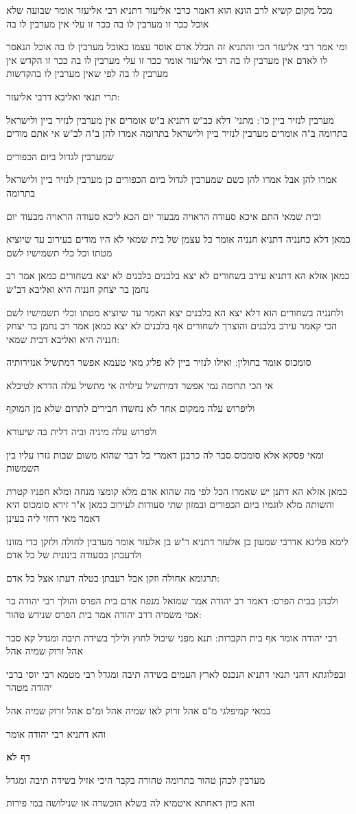 \documentclass[12pt, openany]{book}
\newcommand{\sethebfont}{
\fontsize{10.5pt}{21.0pt} \selectfont
}
\newcommand{\textblock}[1]{
{\sethebfont #1\\}	
}
\newcommand{\sectname}{}
\newcommand{\newsection}[1]{
	\addcontentsline{toc}{section}{#1}
	\renewcommand{\sectname}{#1}	
	\vspace{-\baselineskip}
	\begin{center}
		\textbf{%
\fontsize{16pt}{16pt}\selectfont
			#1}
	\end{center}
	\vspace{-\baselineskip}
	\nopagebreak
}
\begin{document}
\textblock{מכל מקום קשיא לרב הונא הוא דאמר כרבי אליעזר דתניא רבי אליעזר אומר שבועה שלא אוכל ככר זו מערבין לו בה ככר זו עלי אין מערבין לו בה}
\textblock{ומי אמר רבי אליעזר הכי והתניא זה הכלל אדם אוסר עצמו באוכל מערבין לו בה אוכל הנאסר לו לאדם אין מערבין לו בה רבי אליעזר אומר ככר זו עלי מערבין לו בה ככר זו הקדש אין מערבין לו בה לפי שאין מערבין לו בהקדשות}
\textblock{תרי תנאי ואליבא דרבי אליעזר:}
\textblock{מערבין לנזיר ביין כו': מתני' דלא כב"ש דתניא ב"ש אומרים אין מערבין לנזיר ביין ולישראל בתרומה ב"ה אומרים מערבין לנזיר ביין ולישראל בתרומה אמרו להן ב"ה לב"ש אי אתם מודים}
\textblock{שמערבין לגדול ביום הכפורים}
\textblock{אמרו להן אבל אמרו להן כשם שמערבין לגדול ביום הכפורים כן מערבין לנזיר ביין ולישראל בתרומה}
\textblock{ובית שמאי התם איכא סעודה הראויה מבעוד יום הכא ליכא סעודה הראויה מבעוד יום}
\textblock{כמאן דלא כחנניה דתניא חנניה אומר כל עצמן של בית שמאי לא היו מודים בעירוב עד שיוציא מטתו וכל כלי תשמישיו לשם}
\textblock{כמאן אזלא הא דתניא עירב בשחורים לא יצא בלבנים בלבנים לא יצא בשחורים כמאן אמר רב נחמן בר יצחק חנניה היא ואליבא דב"ש}
\textblock{ולחנניה בשחורים הוא דלא יצא הא בלבנים יצא האמר עד שיוציא מטתו וכלי תשמישיו לשם הכי קאמר עירב בלבנים והוצרך לשחורים אף בלבנים לא יצא כמאן אמר רב נחמן בר יצחק חנניה היא ואליבא דבית שמאי:}
\textblock{סומכוס אומר בחולין: ואילו לנזיר ביין לא פליג מאי טעמא אפשר דמתשיל אנזירותיה}
\textblock{אי הכי תרומה נמי אפשר דמיתשיל עילויה אי מתשיל עלה הדרא לטיבלא}
\textblock{וליפרוש עלה ממקום אחר לא נחשדו חבירים לתרום שלא מן המוקף}
\textblock{ולפרוש עלה מיניה וביה דלית בה שיעורא}
\textblock{ומאי פסקא אלא סומכוס סבר לה כרבנן דאמרי כל דבר שהוא משום שבות גזרו עליו בין השמשות}
\textblock{כמאן אזלא הא דתנן יש שאמרו הכל לפי מה שהוא אדם מלא קומצו מנחה ומלא חפניו קטרת והשותה מלא לוגמיו ביום הכפורים ובמזון שתי סעודות לעירוב כמאן א"ר זירא סומכוס היא דאמר מאי דחזי ליה בעינן}
\textblock{לימא פליגא אדרבי שמעון בן אלעזר דתניא ר"ש בן אלעזר אומר מערבין לחולה ולזקן כדי מזונו ולרעבתן בסעודה בינונית של כל אדם}
\textblock{תרגומא אחולה וזקן אבל רעבתן בטלה דעתו אצל כל אדם:}
\textblock{ולכהן בבית הפרס: דאמר רב יהודה אמר שמואל מנפח אדם בית הפרס והולך רבי יהודה בר אמי משמיה דרב יהודה אמר בית הפרס שנידש טהור:}
\textblock{רבי יהודה אומר אף בית הקברות: תנא מפני שיכול לחוץ ולילך בשידה תיבה ומגדל קא סבר אהל זרוק שמיה אהל}
\textblock{ובפלוגתא דהני תנאי דתניא הנכנס לארץ העמים בשידה תיבה ומגדל רבי מטמא רבי יוסי ברבי יהודה מטהר}
\textblock{במאי קמיפלגי מ"ס אהל זרוק לאו שמיה אהל ומ"ס אהל זרוק שמיה אהל}
\textblock{והא דתניא רבי יהודה אומר}
\newsection{דף לא}
\textblock{מערבין לכהן טהור בתרומה טהורה בקבר היכי אזיל בשידה תיבה ומגדל}
\textblock{והא כיון דאחתא איטמיא לה בשלא הוכשרה או שנילושה במי פירות}
\end{document}
